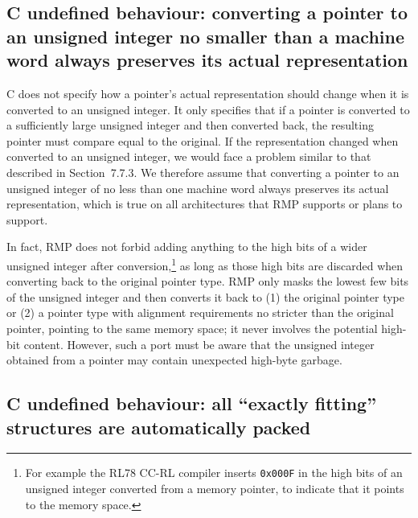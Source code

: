 \subsection{C undefined behaviour: converting a pointer to an unsigned integer no smaller than a machine word always preserves its actual representation}

C does not specify how a pointer's actual representation should change when it is converted to an unsigned integer.
It only specifies that if a pointer is converted to a sufficiently large unsigned integer and then converted back, the resulting pointer must compare equal to the original.
If the representation changed when converted to an unsigned integer, we would face a problem similar to that described in Section~7.7.3.
We therefore assume that converting a pointer to an unsigned integer of no less than one machine word always preserves its actual representation, which is true on all architectures that RMP supports or plans to support.

In fact, RMP does not forbid adding anything to the high bits of a wider unsigned integer after conversion,\footnote{For example the RL78 CC-RL compiler inserts \texttt{0x000F} in the high bits of an unsigned integer converted from a memory pointer, to indicate that it points to the memory space.} as long as those high bits are discarded when converting back to the original pointer type.
RMP only masks the lowest few bits of the unsigned integer and then converts it back to (1) the original pointer type or (2) a pointer type with alignment requirements no stricter than the original pointer, pointing to the same memory space; it never involves the potential high-bit content.
However, such a port must be aware that the unsigned integer obtained from a pointer may contain unexpected high-byte garbage.

\subsection{C undefined behaviour: all ``exactly fitting'' structures are automatically packed}

